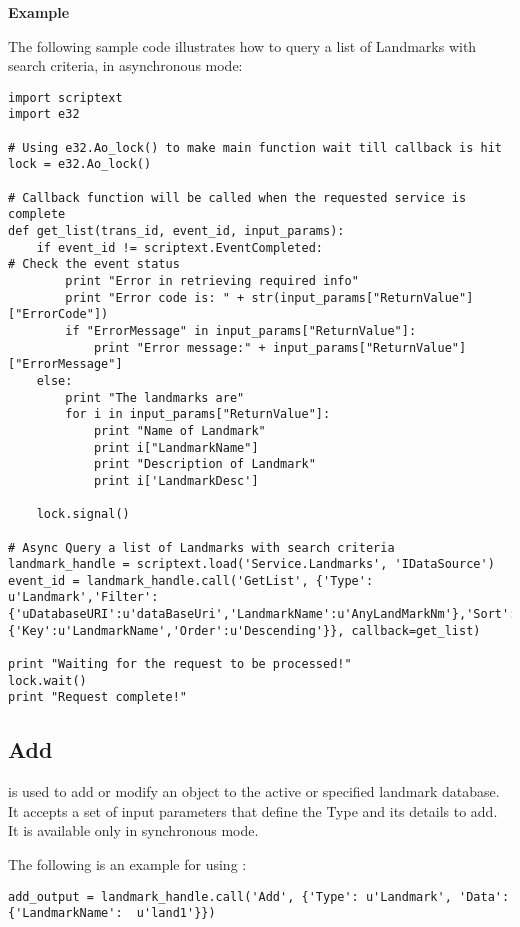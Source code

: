 {\bf Example} \break

The following sample code illustrates how to query a list of Landmarks with search criteria, in asynchronous mode:

\begin{verbatim}
import scriptext
import e32

# Using e32.Ao_lock() to make main function wait till callback is hit
lock = e32.Ao_lock()

# Callback function will be called when the requested service is complete
def get_list(trans_id, event_id, input_params):
    if event_id != scriptext.EventCompleted:   
# Check the event status
        print "Error in retrieving required info"
        print "Error code is: " + str(input_params["ReturnValue"]["ErrorCode"])
        if "ErrorMessage" in input_params["ReturnValue"]:
            print "Error message:" + input_params["ReturnValue"]["ErrorMessage"]
    else:
        print "The landmarks are"
        for i in input_params["ReturnValue"]:
            print "Name of Landmark"
            print i["LandmarkName"]
            print "Description of Landmark"
            print i['LandmarkDesc']

    lock.signal()

# Async Query a list of Landmarks with search criteria
landmark_handle = scriptext.load('Service.Landmarks', 'IDataSource')
event_id = landmark_handle.call('GetList', {'Type': u'Landmark','Filter':{'uDatabaseURI':u'dataBaseUri','LandmarkName':u'AnyLandMarkNm'},'Sort':{'Key':u'LandmarkName','Order':u'Descending'}}, callback=get_list)

print "Waiting for the request to be processed!"
lock.wait()
print "Request complete!"
\end{verbatim}

\subsection{Add}
\label{subsec:landmarkadd}

 is used to add or modify an object to the active or specified landmark database. It accepts a set of input parameters that define the Type and its details to add. It is available only in synchronous mode.

The following is an example for using :

\begin{verbatim}
add_output = landmark_handle.call('Add', {'Type': u'Landmark', 'Data': {'LandmarkName':  u'land1'}})
\end{verbatim}

